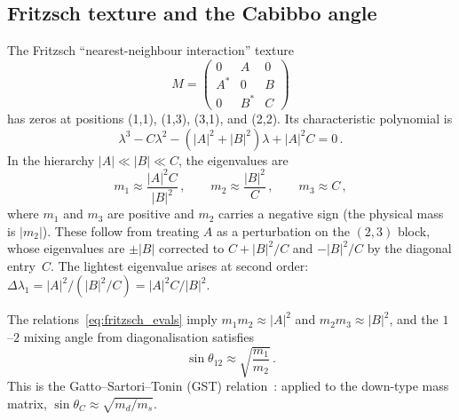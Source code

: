 \subsection{Fritzsch texture and the Cabibbo angle}

The Fritzsch ``nearest-neighbour interaction'' texture
\begin{equation}\label{eq:fritzsch_texture}
M = \begin{pmatrix} 0 & A & 0 \\ A^* & 0 & B \\ 0 & B^* & C \end{pmatrix}
\end{equation}
has zeros at positions (1,1), (1,3), (3,1), and (2,2).
Its characteristic polynomial is
$$
\lambda^3 - C\lambda^2 - (|A|^2 + |B|^2)\lambda + |A|^2 C = 0\,.
$$
In the hierarchy $|A| \ll |B| \ll C$, the eigenvalues are
\begin{equation}\label{eq:fritzsch_evals}
m_1 \approx \frac{|A|^2 C}{|B|^2}\,, \qquad
m_2 \approx \frac{|B|^2}{C}\,, \qquad
m_3 \approx C\,,
\end{equation}
where $m_1$ and $m_3$ are positive and $m_2$ carries a negative
sign (the physical mass is $|m_2|$).  These follow from treating
$A$ as a perturbation on the $(2,3)$ block, whose eigenvalues
are $\pm |B|$ corrected to $C + |B|^2/C$ and $-|B|^2/C$ by the
diagonal entry~$C$.  The lightest eigenvalue arises at second
order:
$\Delta\lambda_1 = |A|^2/(|B|^2/C) = |A|^2 C/|B|^2$.

The relations~\eqref{eq:fritzsch_evals} imply
$m_1 m_2 \approx |A|^2$ and $m_2 m_3 \approx |B|^2$, and
the $1$--$2$ mixing angle from diagonalisation satisfies
\begin{equation}\label{eq:GST}
\sin\theta_{12} \approx \sqrt{\frac{m_1}{m_2}}\,.
\end{equation}
This is the Gatto--Sartori--Tonin (GST) relation~\cite{GST1968}:
applied to the down-type mass matrix,
$\sin\theta_C \approx \sqrt{m_d/m_s}$.

